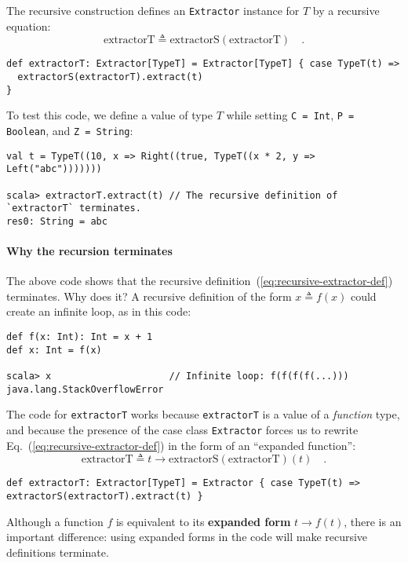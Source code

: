 The recursive construction defines an \lstinline!Extractor! instance
for $T$ by a recursive equation:
\begin{equation}
\text{extractorT}\triangleq\text{extractorS}\left(\text{extractorT}\right)\quad.\label{eq:recursive-extractor-def}
\end{equation}
\begin{lstlisting}
def extractorT: Extractor[TypeT] = Extractor[TypeT] { case TypeT(t) =>
  extractorS(extractorT).extract(t)
}
\end{lstlisting}
To test this code, we define a value of type $T$ while setting \lstinline!C = Int!,
\lstinline!P = Boolean!, and \lstinline!Z = String!:
\begin{lstlisting}
val t = TypeT((10, x => Right((true, TypeT((x * 2, y => Left("abc")))))))

scala> extractorT.extract(t) // The recursive definition of `extractorT` terminates.
res0: String = abc
\end{lstlisting}


\paragraph{Why the recursion terminates}

The above code shows that the recursive definition~(\ref{eq:recursive-extractor-def})
terminates. Why does it? A recursive definition of the form $x\triangleq f(x)$
could create an infinite loop, as in this code:
\begin{lstlisting}
def f(x: Int): Int = x + 1
def x: Int = f(x)

scala> x                     // Infinite loop: f(f(f(f(...)))
java.lang.StackOverflowError
\end{lstlisting}
The code for \lstinline!extractorT! works because \lstinline!extractorT!
is a value of a \emph{function} type, and because the presence of
the case class \lstinline!Extractor! forces us to rewrite Eq.~(\ref{eq:recursive-extractor-def})
in the form of an \textsf{``}expanded function\textsf{''}:
\[
\text{extractorT}\triangleq t\rightarrow\text{extractorS}\left(\text{extractorT}\right)(t)\quad.
\]
\begin{lstlisting}
def extractorT: Extractor[TypeT] = Extractor { case TypeT(t) => extractorS(extractorT).extract(t) }
\end{lstlisting}
Although a function $f$ is equivalent to its \textbf{expanded form}
 $t\rightarrow f(t)$,
there is an important difference: using expanded forms in the code
will make recursive definitions 
terminate.

